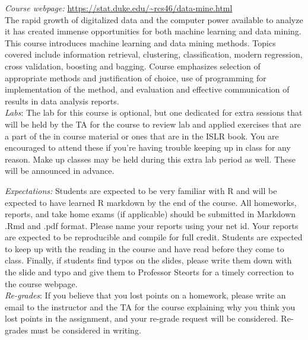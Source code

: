 \documentclass[11pt]{article}
\begin{document}
\emph{Course webpage:} \url{https://stat.duke.edu/~rcs46/data-mine.html} \\
The rapid growth of digitalized data and the computer power available to analyze it has created immense opportunities for both machine learning and data mining. This course introduces machine learning and data mining methods. Topics covered include information retrieval, clustering, classification, modern regression, cross validation, boosting and bagging. Course emphasizes selection of appropriate methods and justification of choice, use of programming for implementation of the method, and evaluation and effective communication of results in data analysis reports. \\

\emph{Labs}: The lab for this course is optional, but one dedicated for extra sessions that will be held by the TA for the course to review lab and applied exercises that are a part of the in course material or ones that are in the ISLR book. You are encouraged to attend these if you're having trouble keeping up in class for any reason. Make up classes may be held during this extra lab period as well. These will be announced in advance. 


\emph{Expectations:} Students are expected to be very familiar with R and will be expected to have learned R markdown by the end of the course. All homeworks, reports, and take home exams (if applicable) should be submitted in Markdown .Rmd and .pdf format. Please name your reports using your net id. Your reports are expected to be reproducible and compile for full credit.  Students are expected to keep up with the reading in the course and have read before they come to class. Finally, if students find typos on the slides, please write them down with the slide and typo and give them to Professor Steorts for a timely correction to the course webpage.  \\

\emph{Re-grades}: If you believe that you lost points on a homework, please write an email to the instructor and the TA for the course explaining why you think you lost points in the assignment, and your re-grade request will be considered. Re-grades must be considered in writing. \\
\end{document}
